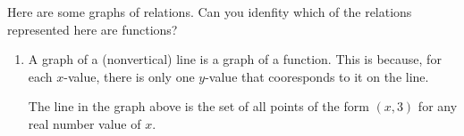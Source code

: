 \documentclass[noauthor, nooutcomes]{ximera}
\begin{document}
\begin{example}
Here are some graphs of relations.  Can you idenfity which of the relations represented here are functions?

	\begin{image}

\hspace{15px}

	
\end{image}


\begin{explanation}
\begin{enumerate}[label=\alph*.]
\item
A graph of a (nonvertical) line is a graph of a function.  This is because, for each $x$-value, there is only one $y$-value that cooresponds to it on the line.

\begin{image}
\end{image}

The line in the graph above is the set of all points of the form $(x,3)$ for any real number value of $x$.  


\end{enumerate}
\end{explanation}
\end{example}
\end{document}
